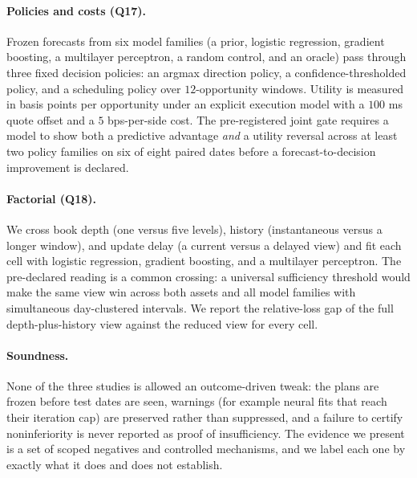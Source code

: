 \paragraph{Policies and costs (Q17).} Frozen forecasts from six model families (a prior,
logistic regression, gradient boosting, a multilayer perceptron, a random control, and an
oracle) pass through three fixed decision policies: an argmax direction policy, a
confidence-thresholded policy, and a scheduling policy over $12$-opportunity windows.
Utility is measured in basis points per opportunity under an explicit execution model
with a $100$ ms quote offset and a $5$ bps-per-side cost. The pre-registered joint gate
requires a model to show both a predictive advantage \emph{and} a utility reversal across
at least two policy families on six of eight paired dates before a forecast-to-decision
improvement is declared.

\paragraph{Factorial (Q18).} We cross book depth (one versus five levels), history
(instantaneous versus a longer window), and update delay (a current versus a delayed
view) and fit each cell with logistic regression, gradient boosting, and a multilayer
perceptron. The pre-declared reading is a common crossing: a universal sufficiency
threshold would make the same view win across both assets and all model families with
simultaneous day-clustered intervals. We report the relative-loss gap of the full
depth-plus-history view against the reduced view for every cell.

\paragraph{Soundness.} None of the three studies is allowed an outcome-driven tweak: the
plans are frozen before test dates are seen, warnings (for example neural fits that reach
their iteration cap) are preserved rather than suppressed, and a failure to certify
noninferiority is never reported as proof of insufficiency. The evidence we present is a
set of scoped negatives and controlled mechanisms, and we label each one by exactly what
it does and does not establish.
